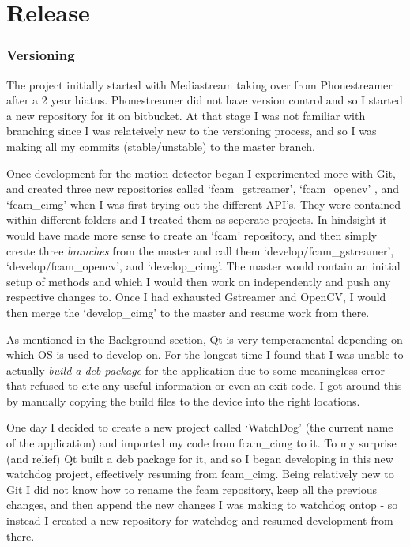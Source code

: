 \part{Release}
\section{Versioning}
The project initially started with Mediastream taking over from Phonestreamer after a  2 year hiatus. Phonestreamer did not have version control and so I started a new repository for it on bitbucket. At that stage I was not familiar with branching since I was relateively new to the versioning process, and so I was making all my commits (stable/unstable) to the master branch.

Once development for the motion detector began I experimented more with Git, and created three new repositories called ‘fcam\_gstreamer’, ‘fcam\_opencv’ , and ‘fcam\_cimg’  when I was first trying out the different API’s. They were contained within different folders and I treated them as seperate projects. In hindsight it would have made more sense to create an ‘fcam’ repository, and then simply create three {\it branches} from the master and call them ‘develop/fcam\_gstreamer’, ‘develop/fcam\_opencv’, and ‘develop\_cimg’. The master would contain an initial setup of methods and which I would then work on independently and push any respective changes to. Once I had exhausted Gstreamer and OpenCV, I would then merge the ‘develop\_cimg’ to the master and resume work from there.

As mentioned in the Background section, Qt is very temperamental depending on which OS is used to develop on. For the longest time I found that I was unable to actually {\it build a deb package} for the application due to some meaningless error that refused to cite any useful information or even an exit code. I got around this by manually copying the build files to the device into the right locations.

One day I decided to create a new project called ‘WatchDog’ (the current name of the application) and imported my code from fcam\_cimg to it. To my surprise (and relief) Qt built a deb package for it, and so I began developing in this new watchdog project, effectively resuming from fcam\_cimg. Being relatively new to Git I did not know how to rename the fcam repository, keep all the previous changes, and then append the new changes I was making to watchdog ontop - so instead I created a new repository for watchdog and resumed development from there.

